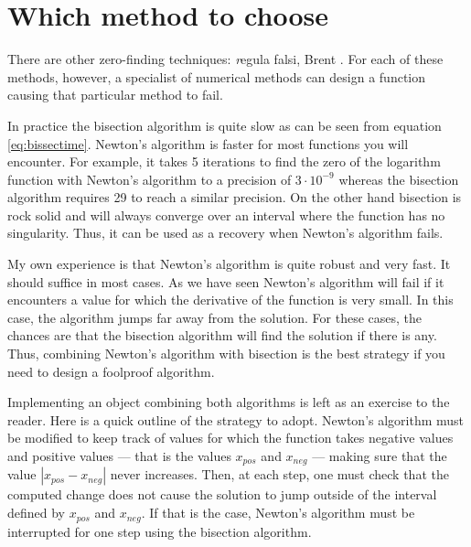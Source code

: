 \section{Which method to choose}
There are other zero-finding techniques: {\textit regula falsi}, Brent
\cite{Press}. For each of these methods, however, a specialist of
numerical methods can design a function causing that particular
method to fail.

In practice the bisection algorithm is quite slow as can be seen
from equation \ref{eq:bissectime}. Newton's algorithm is faster
for most functions you will encounter. For example, it takes 5
iterations to find the zero of the logarithm function with
Newton's algorithm to a precision of $3\cdot 10^{-9}$ whereas the
bisection algorithm requires 29 to reach a similar precision. On
the other hand bisection is rock solid and will always converge
over an interval where the function has no singularity. Thus, it
can be used as a recovery when Newton's algorithm fails.

My own experience is that Newton's algorithm is quite robust and
very fast. It should suffice in most cases. As we have seen
Newton's algorithm will fail if it encounters a value for which
the derivative of the function is very small. In this case, the
algorithm jumps far away from the solution. For these cases, the
chances are that the bisection algorithm will find the solution if
there is any. Thus, combining Newton's algorithm with bisection is
the best strategy if you need to design a foolproof algorithm.

Implementing an object combining both algorithms is left as an
exercise to the reader. Here is a quick outline of the strategy to
adopt. Newton's algorithm must be modified to keep track of values
for which the function takes negative values and positive values
--- that is the values $x_{pos}$ and $x_{neg}$
--- making sure that the value $\left| x_{pos}-x_{neg}\right|$
never increases. Then, at each step, one must check that the
computed change does not cause the solution to jump outside of the
interval defined by $x_{pos}$ and $x_{neg}$.
If that is the case, Newton's algorithm must be interrupted for one step using the bisection algorithm.

